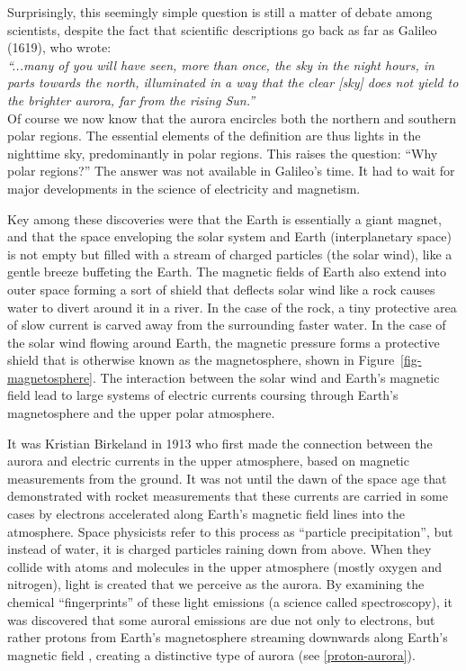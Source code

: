 \documentclass{article}
\renewcommand{\cite}[1]{\parencite{#1}}
\begin{document}
Surprisingly, this seemingly simple question is still a matter of debate among scientists, despite the fact that scientific descriptions go back as far as Galileo (1619), who wrote:\\
\textit{``...many of you will have seen, more than once, the sky in the night hours, in parts towards the north, illuminated in a way that the clear [sky] does not yield to the brighter aurora, far from the rising Sun.''}\\
Of course we now know that the aurora encircles both the northern and southern polar regions. The essential elements of the definition are thus lights in the nighttime sky, predominantly in polar regions. This raises the question: ``Why polar regions?'' The answer was not available in Galileo's time. It had to wait for major developments in the science of electricity and magnetism. 

Key among these discoveries were that the Earth is essentially a giant magnet, and that the space enveloping the solar system and Earth (interplanetary space) is not empty but filled with a stream of charged particles (the solar wind), like a gentle breeze buffeting the Earth. The magnetic fields of Earth also extend into outer space forming a sort of shield that deflects solar wind like a rock causes water to divert around it in a river. In the case of the rock, a tiny protective area of slow current is carved away from the surrounding faster water. In the case of the solar wind flowing around Earth, the magnetic pressure forms a protective shield that is otherwise known as the magnetosphere, shown in Figure~\ref{fig-magnetosphere}. The interaction between the solar wind and Earth's magnetic field lead to large systems of electric currents coursing through Earth's magnetosphere and the upper polar atmosphere. 

It was Kristian Birkeland in 1913 who first made the connection between the aurora and electric currents in the upper atmosphere, based on magnetic measurements from the ground. It was not until the dawn of the space age that \textcite{McIlwain1960} demonstrated with rocket measurements that these currents are carried in some cases by electrons accelerated along Earth's magnetic field lines into the atmosphere. Space physicists refer to this process as ``particle precipitation'', but instead of water, it is charged particles raining down from above. When they collide with atoms and molecules in the upper atmosphere (mostly oxygen and nitrogen), light is created that we perceive as the aurora. By examining the chemical ``fingerprints'' of these light emissions (a science called spectroscopy), it was discovered that some auroral emissions are due not only to electrons, but rather protons from Earth's magnetosphere streaming downwards along Earth's magnetic field \cite{Vegard1939}, creating a distinctive type of aurora (see \ref{proton-aurora}).  
\end{document}
